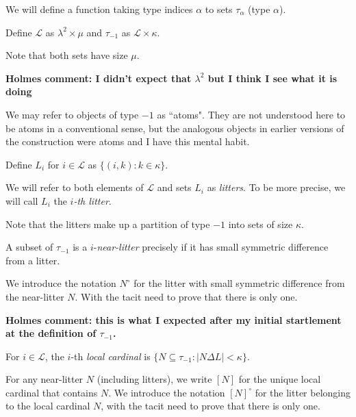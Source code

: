 We will define a function taking type indices $\alpha$ to sets $\tau_\alpha$ (type $\alpha$).

\begin{definition}
\label {def:atom}
\leanok
{}
Define $\mathcal L$ as $ \lambda ^ 2 \times \mu$ and $\tau_{-1}$ as $\mathcal L \times \kappa$.

Note that both sets have size $\mu$.
\end{definition}

{\bf Holmes comment:  I didn't expect that $\lambda^2$ but I think I see what it is doing}

We may refer to objects of type $-1$ as ``atoms".  They are not understood here to be atoms in a conventional sense, but the analogous objects in earlier versions of the construction were atoms and I have this mental habit.

\begin{definition}
\label {def:litter}
\leanok
{}
Define $L_i$ for $i \in \mathcal L$ as $\{(i, k) : k \in \kappa\}$.

We will refer to both elements of $\mathcal L$ and sets $L_i$ as {\em litters}. To be more precise,
we will call $L_i$ the {\em $i$-th litter}.

Note that the litters make up a partition of type $-1$ into sets of size $\kappa$.
\end{definition}

\begin{definition}
\label {def:near-litter}
\leanok
{}
A subset of $\tau_{-1}$ is a $i$-{\em near-litter} precisely if it has small symmetric difference from  a litter.

We introduce the notation $N^\circ$ for the litter with small symmetric difference from the near-litter $N$.
With the tacit need to prove that there is only one.
\end{definition}

{\bf Holmes comment:  this is what I expected after my initial startlement at the definition of $\tau_{-1}$.}

\begin{definition}
\label {def:local-cardinal}
\leanok
For $i \in \mathcal L$, the $i$-th {\em local cardinal} is $\{N \subseteq \tau_{-1}:|N \Delta L|<\kappa\}$.

For any near-litter $N$ (including litters), we write $[N]$ for the unique local cardinal that contains $N$. We introduce the notation $[N]^\circ$ for the litter belonging to the local cardinal $N$, with the tacit need to prove that there is only one.
\end{definition}

